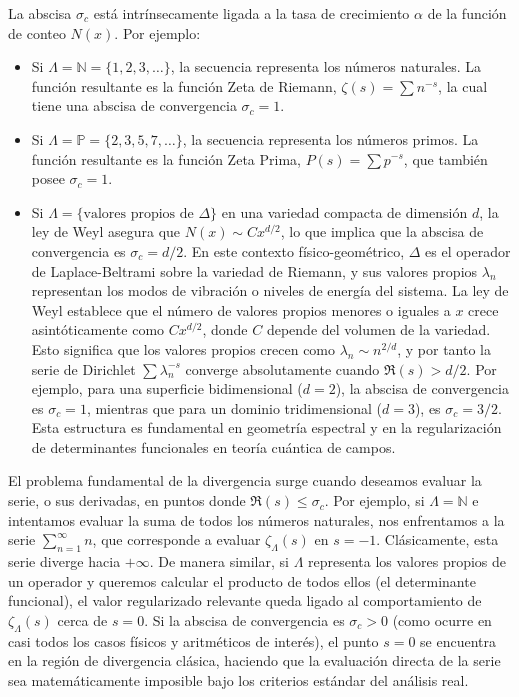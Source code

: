 La abscisa $\sigma_c$ está intrínsecamente ligada a la tasa de crecimiento $\alpha$ de la función de conteo $N(x)$. Por ejemplo:
\begin{itemize}
    \item Si $\Lambda = \mathbb{N} = \{1, 2, 3, \dots\}$, la secuencia representa los números naturales. La función resultante es la función Zeta de Riemann, $\zeta(s) = \sum n^{-s}$, la cual tiene una abscisa de convergencia $\sigma_c = 1$.
    \item Si $\Lambda = \mathbb{P} = \{2, 3, 5, 7, \dots\}$, la secuencia representa los números primos. La función resultante es la función Zeta Prima, $P(s) = \sum p^{-s}$, que también posee $\sigma_c = 1$.
    \item Si $\Lambda = \{\text{valores propios de } \Delta\}$ en una variedad compacta de dimensión $d$, la ley de Weyl asegura que $N(x) \sim C x^{d/2}$, lo que implica que la abscisa de convergencia es $\sigma_c = d/2$. En este contexto físico-geométrico, $\Delta$ es el operador de Laplace-Beltrami sobre la variedad de Riemann, y sus valores propios $\lambda_n$ representan los modos de vibración o niveles de energía del sistema. La ley de Weyl establece que el número de valores propios menores o iguales a $x$ crece asintóticamente como $C x^{d/2}$, donde $C$ depende del volumen de la variedad. Esto significa que los valores propios crecen como $\lambda_n \sim n^{2/d}$, y por tanto la serie de Dirichlet $\sum \lambda_n^{-s}$ converge absolutamente cuando $\Re(s) > d/2$. Por ejemplo, para una superficie bidimensional ($d=2$), la abscisa de convergencia es $\sigma_c = 1$, mientras que para un dominio tridimensional ($d=3$), es $\sigma_c = 3/2$. Esta estructura es fundamental en geometría espectral y en la regularización de determinantes funcionales en teoría cuántica de campos.
\end{itemize}

El problema fundamental de la divergencia surge cuando deseamos evaluar la serie, o sus derivadas, en puntos donde $\Re(s) \le \sigma_c$. Por ejemplo, si $\Lambda = \mathbb{N}$ e intentamos evaluar la suma de todos los números naturales, nos enfrentamos a la serie $\sum_{n=1}^{\infty} n$, que corresponde a evaluar $\zeta_\Lambda(s)$ en $s = -1$. Clásicamente, esta serie diverge hacia $+\infty$. De manera similar, si $\Lambda$ representa los valores propios de un operador y queremos calcular el producto de todos ellos (el determinante funcional), el valor regularizado relevante queda ligado al comportamiento de $\zeta_\Lambda(s)$ cerca de $s = 0$. Si la abscisa de convergencia es $\sigma_c > 0$ (como ocurre en casi todos los casos físicos y aritméticos de interés), el punto $s=0$ se encuentra en la región de divergencia clásica, haciendo que la evaluación directa de la serie sea matemáticamente imposible bajo los criterios estándar del análisis real.

